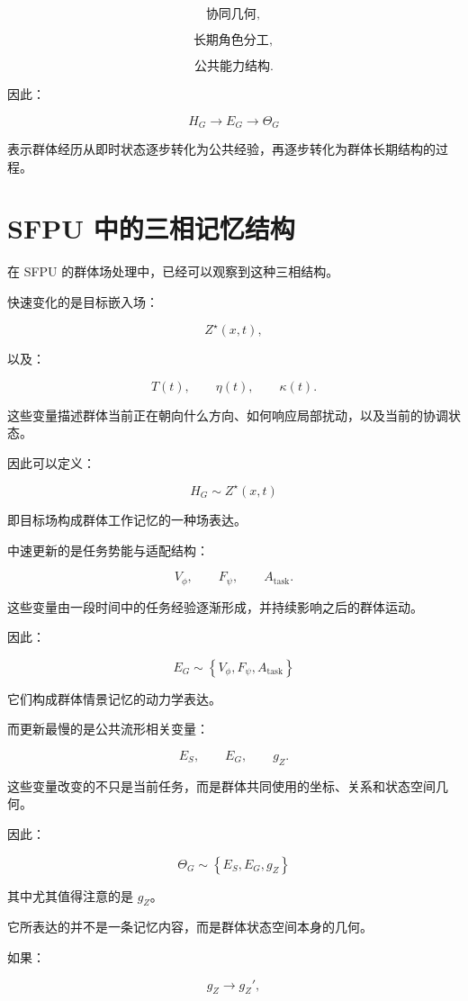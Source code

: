\[
\text{协同几何},
\]

\[
\text{长期角色分工},
\]

\[
\text{公共能力结构}.
\]

因此：

\[
\boxed{
H_G
\rightarrow
E_G
\rightarrow
\Theta_G
}
\]

表示群体经历从即时状态逐步转化为公共经验，再逐步转化为群体长期结构的过程。


\section{SFPU 中的三相记忆结构}

在 SFPU 的群体场处理中，已经可以观察到这种三相结构。

快速变化的是目标嵌入场：

\[
Z^\star(x,t),
\]

以及：

\[
T(t),
\qquad
\eta(t),
\qquad
\kappa(t).
\]

这些变量描述群体当前正在朝向什么方向、如何响应局部扰动，以及当前的协调状态。

因此可以定义：

\[
\boxed{
H_G
\sim
Z^\star(x,t)
}
\]

即目标场构成群体工作记忆的一种场表达。

中速更新的是任务势能与适配结构：

\[
V_\phi,
\qquad
F_\psi,
\qquad
A_{\mathrm{task}}.
\]

这些变量由一段时间中的任务经验逐渐形成，并持续影响之后的群体运动。

因此：

\[
\boxed{
E_G
\sim
\left\{
V_\phi,
F_\psi,
A_{\mathrm{task}}
\right\}
}
\]

它们构成群体情景记忆的动力学表达。

而更新最慢的是公共流形相关变量：

\[
E_S,
\qquad
E_G,
\qquad
g_Z.
\]

这些变量改变的不只是当前任务，而是群体共同使用的坐标、关系和状态空间几何。

因此：

\[
\boxed{
\Theta_G
\sim
\left\{
E_S,
E_G,
g_Z
\right\}
}
\]

其中尤其值得注意的是 $g_Z$。

它所表达的并不是一条记忆内容，而是群体状态空间本身的几何。

如果：

\[
g_Z
\rightarrow
g_Z',
\]

